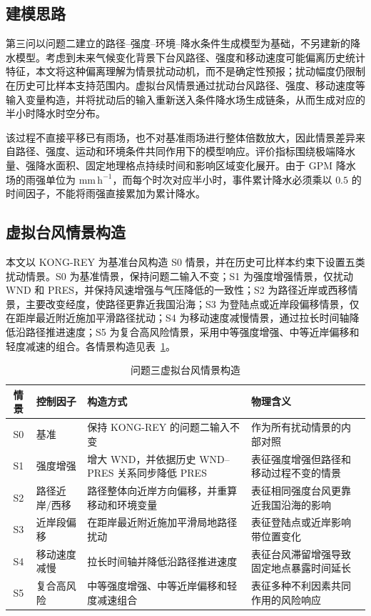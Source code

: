 \documentclass[UTF8,a4paper,zihao=5,fontset=fandol]{ctexart}
\numberwithin{equation}{section}
\numberwithin{figure}{section}
\numberwithin{table}{section}
\begin{document}
\subsection{建模思路}

第三问以问题二建立的路径--强度--环境--降水条件生成模型为基础，不另建新的降水模型。考虑到未来气候变化背景下台风路径、强度和移动速度可能偏离历史统计特征，本文将这种偏离理解为情景扰动动机，而不是确定性预报；扰动幅度仍限制在历史可比样本支持范围内。虚拟台风情景通过扰动台风路径、强度、移动速度等输入变量构造，并将扰动后的输入重新送入条件降水场生成链条，从而生成对应的半小时降水时空分布。

该过程不直接平移已有雨场，也不对基准雨场进行整体倍数放大，因此情景差异来自路径、强度、运动和环境条件共同作用下的模型响应。评价指标围绕极端降水量、强降水面积、固定地理格点持续时间和影响区域变化展开。由于 GPM 降水场的雨强单位为 $\mathrm{mm\,h^{-1}}$，而每个时次对应半小时，事件累计降水必须乘以 $0.5$ 的时间因子，不能将雨强直接累加为累计降水。

\subsection{虚拟台风情景构造}

本文以 KONG-REY 为基准台风构造 S0 情景，并在历史可比样本约束下设置五类扰动情景。S0 为基准情景，保持问题二输入不变；S1 为强度增强情景，仅扰动 WND 和 PRES，并保持风速增强与气压降低的一致性；S2 为路径近岸或西移情景，主要改变经度，使路径更靠近我国沿海；S3 为登陆点或近岸段偏移情景，仅在距岸最近附近施加平滑路径扰动；S4 为移动速度减慢情景，通过拉长时间轴降低沿路径推进速度；S5 为复合高风险情景，采用中等强度增强、中等近岸偏移和轻度减速的组合。各情景构造见表~\ref{tab:problem3_scenarios}。

\begin{table}[H]
  \centering
  \small
  \caption{问题三虚拟台风情景构造}
  \label{tab:problem3_scenarios}
  \begin{tabularx}{\linewidth}{c l X X}
    \toprule
    情景 & 控制因子 & 构造方式 & 物理含义 \\
    \midrule
    S0 & 基准 & 保持 KONG-REY 的问题二输入不变 & 作为所有扰动情景的内部对照 \\
    S1 & 强度增强 & 增大 WND，并依据历史 WND--PRES 关系同步降低 PRES & 表征强度增强但路径和移动过程不变的情景 \\
    S2 & 路径近岸/西移 & 路径整体向近岸方向偏移，并重算移动和环境变量 & 表征相同强度台风更靠近我国沿海的影响 \\
    S3 & 近岸段偏移 & 在距岸最近附近施加平滑局地路径扰动 & 表征登陆点或近岸影响带位置变化 \\
    S4 & 移动速度减慢 & 拉长时间轴并降低沿路径推进速度 & 表征台风滞留增强导致固定地点暴露时间延长 \\
    S5 & 复合高风险 & 中等强度增强、中等近岸偏移和轻度减速组合 & 表征多种不利因素共同作用的风险响应 \\
    \bottomrule
  \end{tabularx}
\end{table}
\end{document}
